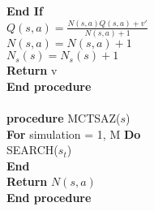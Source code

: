 \documentclass{article}
\begin{document}
\indent \textbf{End If} \\
\indent $Q(s,a) = \frac{N(s,a) Q(s,a) + v'}{N(s,a) + 1}$ \\
\indent $N(s,a) = N(s,a) + 1$ \\
\indent $N_s(s) = N_s(s) + 1$ \\
\indent \textbf{Return} v \\
\textbf{End procedure} \\
\\
\textbf{procedure} MCTSAZ($s$) \\
\indent \textbf{For} simulation = 1, M \textbf{Do} \\
\indent \indent SEARCH($s_t$) \\
\indent \textbf{End} \\
\indent \textbf{Return} $N(s,a)$\\
\textbf{End procedure} \\


\pagebreak
\end{document}
